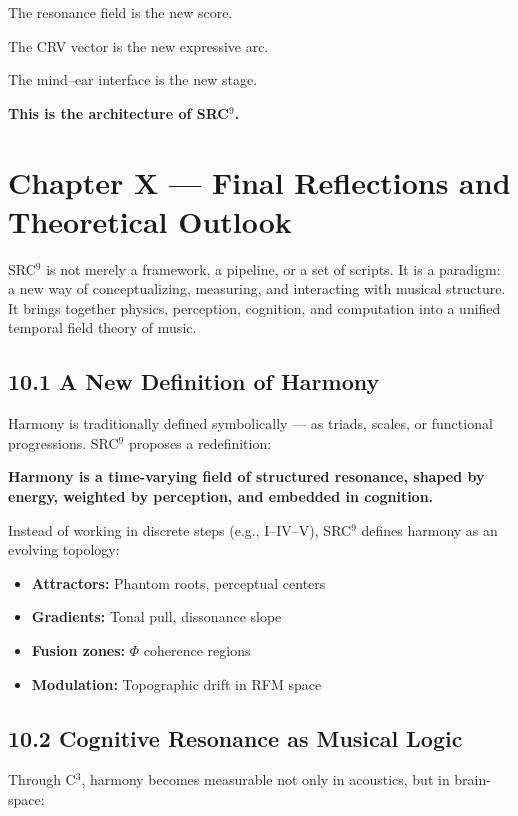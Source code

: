 \documentclass[10pt]{article}
\begin{document}
The resonance field is the new score.

The CRV vector is the new expressive arc.

The mind–ear interface is the new stage.

\textbf{This is the architecture of SRC$^{9}$.}

\section*{Chapter X — Final Reflections and Theoretical Outlook}

SRC$^{9}$ is not merely a framework, a pipeline, or a set of scripts. It is a paradigm: a new way of conceptualizing, measuring, and interacting with musical structure. It brings together physics, perception, cognition, and computation into a unified temporal field theory of music.

\subsection*{10.1 A New Definition of Harmony}

Harmony is traditionally defined symbolically — as triads, scales, or functional progressions. SRC$^{9}$ proposes a redefinition:

\textbf{Harmony is a time-varying field of structured resonance, shaped by energy, weighted by perception, and embedded in cognition.}

Instead of working in discrete steps (e.g., I–IV–V), SRC$^{9}$ defines harmony as an evolving topology:

\begin{itemize}
    \item \textbf{Attractors:} Phantom roots, perceptual centers
    \item \textbf{Gradients:} Tonal pull, dissonance slope
    \item \textbf{Fusion zones:} $\Phi$ coherence regions
    \item \textbf{Modulation:} Topographic drift in RFM space
\end{itemize}

\subsection*{10.2 Cognitive Resonance as Musical Logic}

Through C$^{3}$, harmony becomes measurable not only in acoustics, but in brain-space:
\end{document}
